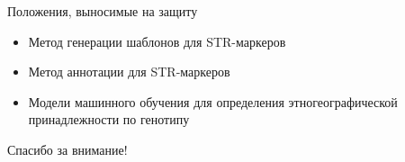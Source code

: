 \documentclass[8pt]{beamer}
\begin{document}
\begin{frame}{Положения, выносимые на защиту}
    \begin{itemize}
        \item Метод генерации шаблонов для STR-маркеров
        \item Метод аннотации для STR-маркеров
        \item Модели машинного обучения для определения этногеографической принадлежности по генотипу
    \end{itemize}
\end{frame}


\begin{frame}
\huge{\centerline{Спасибо за внимание!}}
\end{frame}
\end{document}

